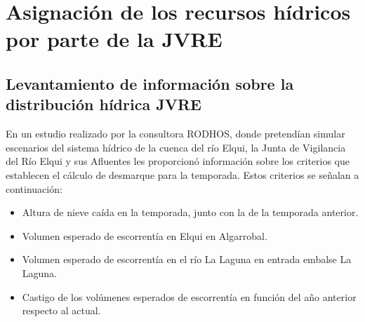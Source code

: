 \documentclass[11pt,]{article}
\begin{document}
    	
		
	


\section{Asignación de los recursos hídricos por parte de la JVRE}\bigskip





		\subsection{Levantamiento de información sobre la distribución hídrica JVRE}
		En un estudio realizado por la consultora RODHOS, donde pretendían simular escenarios del sistema hídrico de la cuenca del río Elqui, la Junta de Vigilancia del Río Elqui y sus Afluentes les proporcionó información sobre los criterios que establecen el cálculo de desmarque para la temporada. Estos criterios se señalan a continuación:\bigskip
		
		\begin{itemize}
		
		\item Altura de nieve caída en la temporada, junto con la de la temporada anterior.
		\item Volumen esperado de escorrentía en Elqui en Algarrobal.
		\item Volumen esperado de escorrentía en el río La Laguna en entrada embalse La Laguna.
		\item Castigo de los volúmenes esperados de escorrentía en función del año anterior respecto al actual.
		
		\end{itemize}
		
\end{document}
